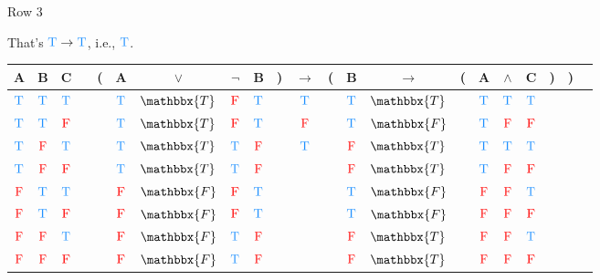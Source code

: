 \documentclass[
  ignorenonframetext,
]{beamer}
\renewcommand{\,}{\text{, }}
\def\True{\textcolor{dodgerblue}{\text{T}}}
\def\False{\textcolor{red}{\text{F}}}
\begin{document}
\begin{frame}{Row 3}
\protect\hypertarget{row-3-1}{}

That's \(\True \rightarrow \True\), i.e., \(\True\).

\begin{center}
\bigskip
\begin{tabular}{@{ }c@{ }@{ }c@{ }@{ }c | c@{ }@{}c@{}@{ }c@{ }@{ }c@{ }@{ }c@{ }@{ }c@{ }@{}c@{}@{ }c@{ }@{}c@{}@{ }c@{ }@{ }c@{ }@{}c@{}@{ }c@{ }@{ }c@{ }@{ }c@{ }@{}c@{}@{}c@{}@{ }c}
A & B & C &  & ( & A & $\vee$ & $\neg$ & B & ) & $\rightarrow$ & ( & B & $\rightarrow$ & ( & A & $\wedge$ & C & ) & ) & \\
\hline 
 $\True$ & $\True$ & $\True$ &  &  & $\True$ & $\mathbbx{T}$ & $\False$ & $\True$ &  &\textcolor{red}{$\True$}&  & $\True$ & $\mathbbx{T}$ &  & $\True$ & $\True$ & $\True$ &  &  & \\
 $\True$ & $\True$ & $\False$ &  &  & $\True$ & $\mathbbx{T}$ & $\False$ & $\True$ &  &\textcolor{red}{$\False$}&  & $\True$ & $\mathbbx{F}$ &  & $\True$ & $\False$ & $\False$ &  &  & \\
 $\True$ & $\False$ & $\True$ &  &  & $\True$ & $\mathbbx{T}$ & $\True$ & $\False$ &  &\textcolor{red}{$\True$}&  & $\False$ & $\mathbbx{T}$ &  & $\True$ & $\True$ & $\True$ &  &  & \\
 $\True$ & $\False$ & $\False$ &  &  & $\True$ & $\mathbbx{T}$ & $\True$ & $\False$ &  &&  & $\False$ & $\mathbbx{T}$ &  & $\True$ & $\False$ & $\False$ &  &  & \\
 $\False$ & $\True$ & $\True$ &  &  & $\False$ & $\mathbbx{F}$ & $\False$ & $\True$ &  &&  & $\True$ & $\mathbbx{F}$ &  & $\False$ & $\False$ & $\True$ &  &  & \\
 $\False$ & $\True$ & $\False$ &  &  & $\False$ & $\mathbbx{F}$ & $\False$ & $\True$ &  &&  & $\True$ & $\mathbbx{F}$ &  & $\False$ & $\False$ & $\False$ &  &  & \\
 $\False$ & $\False$ & $\True$ &  &  & $\False$ & $\mathbbx{F}$ & $\True$ & $\False$ &  &&  & $\False$ & $\mathbbx{T}$ &  & $\False$ & $\False$ & $\True$ &  &  & \\
 $\False$ & $\False$ & $\False$ &  &  & $\False$ & $\mathbbx{F}$ & $\True$ & $\False$ &  &&  & $\False$ & $\mathbbx{T}$ &  & $\False$ & $\False$ & $\False$ &  &  & \\
\end{tabular}
\bigskip
\end{center}

\end{frame}
\end{document}
